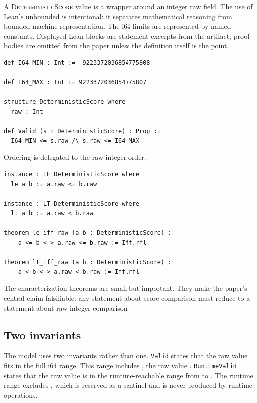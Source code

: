 \documentclass[a4paper,UKenglish,cleveref,autoref,thm-restate,anonymous]{lipics-v2021}
\newcommand{\leanname}[1]{\texttt{\detokenize{#1}}}
\newcommand{\ds}{\textsc{DeterministicScore}\xspace}
\newcommand{\runtimevalid}{\texttt{RuntimeValid}\xspace}
\newcommand{\valid}{\texttt{Valid}\xspace}
\begin{document}
A \ds value is a wrapper around an integer raw field.  The use of Lean's unbounded \leanname{Int} is intentional: it separates mathematical reasoning from bounded-machine representation.  The i64 limits are represented by named constants. Displayed Lean blocks are statement excerpts from the artifact; proof bodies are omitted from the paper unless the definition itself is the point.

\begin{lstlisting}[language=Lean,caption={Core score type and i64 validity predicate.},label={lst:score-type}]
def I64_MIN : Int := -9223372036854775808

def I64_MAX : Int := 9223372036854775807

structure DeterministicScore where
  raw : Int

def Valid (s : DeterministicScore) : Prop :=
  I64_MIN <= s.raw /\ s.raw <= I64_MAX
\end{lstlisting}

Ordering is delegated to the raw integer order.

\begin{lstlisting}[language=Lean,caption={Order definition and characterization.},label={lst:raw-order}]
instance : LE DeterministicScore where
  le a b := a.raw <= b.raw

instance : LT DeterministicScore where
  lt a b := a.raw < b.raw

theorem le_iff_raw (a b : DeterministicScore) :
    a <= b <-> a.raw <= b.raw := Iff.rfl

theorem lt_iff_raw (a b : DeterministicScore) :
    a < b <-> a.raw < b.raw := Iff.rfl
\end{lstlisting}

The characterization theorems are small but important.  They make the paper's central claim falsifiable: any statement about score comparison must reduce to a statement about raw integer comparison.

\subsection{Two invariants}

The model uses two invariants rather than one.  \valid states that the raw value fits in the full i64 range.  This range includes \leanname{MIN}, the raw value \leanname{I64_MIN}.  \runtimevalid states that the raw value is in the runtime-reachable range from \leanname{NEG_INF} to \leanname{MAX}.  The runtime range excludes \leanname{MIN}, which is reserved as a sentinel and is never produced by runtime operations.
\end{document}
